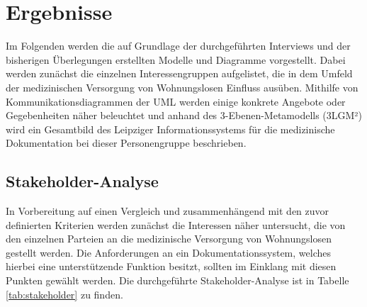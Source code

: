 \chapter{Ergebnisse}\label{ch:results}

Im Folgenden werden die auf Grundlage der durchgeführten Interviews und der bisherigen Überlegungen erstellten Modelle und Diagramme vorgestellt. Dabei werden zunächst die einzelnen Interessengruppen aufgelistet, die in dem Umfeld der medizinischen Versorgung von Wohnungslosen Einfluss ausüben. Mithilfe von Kommunikationsdiagrammen der \ac{UML} werden einige konkrete Angebote oder Gegebenheiten näher beleuchtet und anhand des 3-Ebenen-Metamodells (\acs{3LGM²}) wird ein Gesamtbild des Leipziger Informationssystems für die medizinische Dokumentation bei dieser Personengruppe beschrieben.

\section{Stakeholder-Analyse}\label{sec:stakeholder}

In Vorbereitung auf einen Vergleich und zusammenhängend mit den zuvor definierten Kriterien werden zunächst die Interessen näher untersucht, die von den einzelnen Parteien an die medizinische Versorgung von Wohnungslosen gestellt werden. Die Anforderungen an ein Dokumentationssystem, welches hierbei eine unterstützende Funktion besitzt, sollten im Einklang mit diesen Punkten gewählt werden. Die durchgeführte Stakeholder-Analyse ist in Tabelle \ref{tab:stakeholder} zu finden.

